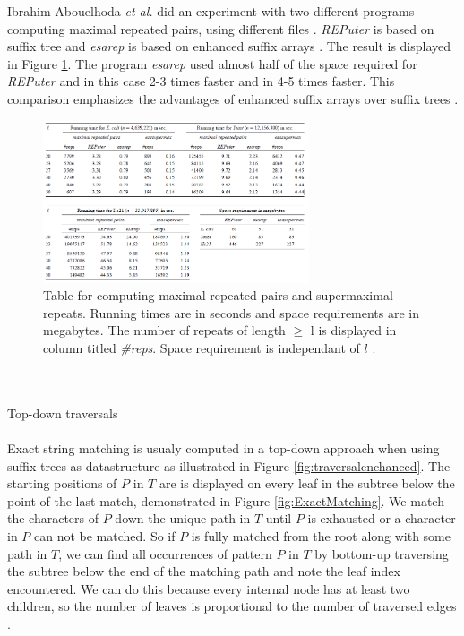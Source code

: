 \documentclass[12pt]{article} %
\begin{document}
Ibrahim Abouelhoda \emph{et al.} did an experiment with two different programs computing maximal repeated pairs, using different files \cite{enchancedsuffix}. \emph{REPuter} is based on suffix tree and \emph{esarep} is based on enhanced suffix arrays \cite{enchancedsuffix}. The result is displayed in Figure \ref{fig:ButtomUp}.
The program \emph{esarep} used almost half of the space required for \emph{REPuter} and in this case 2-3 times faster and in 4-5 times faster. This comparison emphasizes the advantages of enhanced suffix arrays over suffix trees \cite{enchancedsuffix}.
\begin{figure}[H]
    \centering
    \includegraphics[width=0.7\textwidth]{ButtomUp}
    \captionsetup{width=0.8\textwidth}
    \caption{Table for computing maximal repeated pairs and supermaximal repeats. Running times are in seconds and space requirements are in megabytes. The number of repeats of length $\geq$ l is displayed in column titled \emph{\#reps}. Space requirement is independant of $l$ \cite{enchancedsuffix}.}
    \label{fig:ButtomUp}
\end{figure}
\\ \\
Top-down traversals
\\ \\
Exact string matching is usualy computed in a top-down approach when using suffix trees as datastructure as illustrated in Figure \ref{fig:traversalenchanced}.
The starting positions of $P$ in $T$ are is displayed on every leaf in the subtree below the point of the last match, demonstrated in Figure \ref{fig:ExactMatching}. We match the characters of $P$ down the unique path in $T$ until $P$ is exhausted or a character in $P$ can not be matched. So if $P$ is fully matched from the root along with some path in $T$, we can find all occurrences of pattern $P$ in $T$ by bottom-up traversing the subtree below the end of the matching path and note the leaf index encountered. We can do this because every internal node has at least two children, so the number of leaves is proportional to the number of traversed edges \cite{gusfield}.
\end{document}
